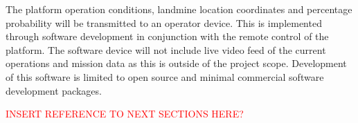 \documentclass[main.tex]{subfiles}
\begin{document}
The platform operation conditions, landmine location coordinates and percentage probability will be transmitted to an operator device. This is implemented through software development in conjunction with the remote control of the platform. The software device will not include live video feed of the current operations and mission data as this is outside of the project scope. Development of this software is limited to open source and minimal commercial software development packages.

\textcolor{red}{INSERT REFERENCE TO NEXT SECTIONS HERE?}
 
\end{document}
